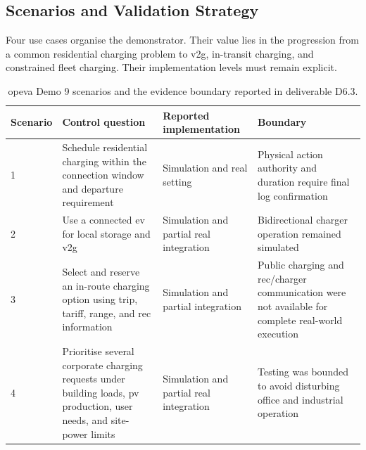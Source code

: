 
\subsection{Scenarios and Validation Strategy}
\label{sec:opeva-validation}

Four use cases organise the demonstrator. Their value lies in the progression from a common residential charging problem to \gls{v2g}, in-transit charging, and constrained fleet charging. Their implementation levels must remain explicit.

\begin{table}[htbp]
\centering
\caption{\gls{opeva} Demo 9 scenarios and the evidence boundary reported in deliverable D6.3.}
\label{tab:opeva-scenarios}
\footnotesize
\begin{tabularx}{\textwidth}{@{}p{}p{}p{}X@{}}
\toprule
\textbf{Scenario} & \textbf{Control question} & \textbf{Reported implementation} & \textbf{Boundary} \\
\midrule
1 & Schedule residential charging within the connection window and departure requirement & Simulation and real setting & Physical action authority and duration require final log confirmation \\
2 & Use a connected \gls{ev} for local storage and \gls{v2g} & Simulation and partial real integration & Bidirectional charger operation remained simulated \\
3 & Select and reserve an in-route charging option using trip, tariff, range, and \gls{rec} information & Simulation and partial integration & Public charging and \gls{rec}/charger communication were not available for complete real-world execution \\
4 & Prioritise several corporate charging requests under building loads, \gls{pv} production, user needs, and site-power limits & Simulation and partial real integration & Testing was bounded to avoid disturbing office and industrial operation \\
\bottomrule
\end{tabularx}
\end{table}

